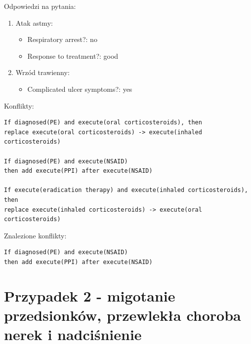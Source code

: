 \documentclass[oneside,a4paper]{book}
\begin{document}
\begin{spacing}{1.5}
\begin{figure}[H]
\end{figure}
\newpage
\noindent Odpowiedzi na pytania:
\begin{enumerate}
\item{Atak astmy:
	\begin{itemize}
	\item{Respiratory arrest?: no}
	\item{Response to treatment?: good}
	\end{itemize}
}
\item{Wrzód trawienny:
	\begin{itemize}
	\item{Complicated ulcer symptoms?: yes}
	\end{itemize}
}
\end{enumerate}
Konflikty:
\begin{verbatim}
If diagnosed(PE) and execute(oral corticosteroids), then 
replace execute(oral corticosteroids) -> execute(inhaled corticosteroids)

If diagnosed(PE) and execute(NSAID)
then add execute(PPI) after execute(NSAID)

If execute(eradication therapy) and execute(inhaled corticosteroids), then
replace execute(inhaled corticosteroids) -> execute(oral corticosteroids)
\end{verbatim}
Znalezione konflikty:
\begin{verbatim}
If diagnosed(PE) and execute(NSAID) 
then add execute(PPI) after execute(NSAID)
\end{verbatim}
\newpage
\section{Przypadek 2 - migotanie przedsionków, przewlekła choroba nerek i nadciśnienie}


\end{spacing}
\end{document}
